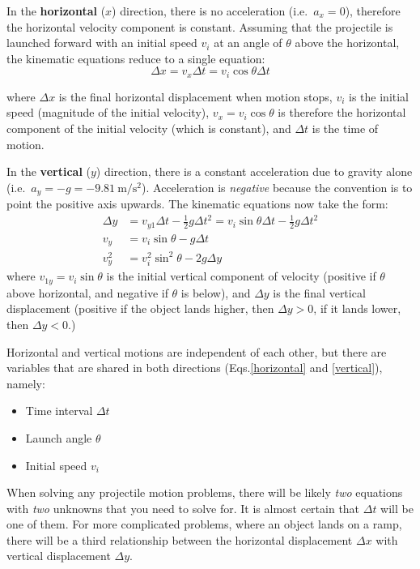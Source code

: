 In the \textbf{horizontal} ($x$) direction, there is no acceleration (i.e.\
$a_x=0$), therefore the horizontal velocity component is constant. Assuming
that the projectile is launched forward with an initial speed $v_i$ at an angle
of $\theta$ above the horizontal, the kinematic equations reduce to a single
equation:
\begin{equation}
  \Delta x=v_x\Delta t=v_i\cos\theta\Delta t
  \label{horizontal}
\end{equation}

where $\Delta x$ is the final horizontal displacement when motion stops,
$v_i$ is the initial speed (magnitude of the initial velocity),
$v_x=v_i\cos\theta$ is therefore the horizontal component of the
initial velocity (which is constant), and $\Delta t$ is the time of motion.

In the \textbf{vertical} ($y$) direction, there is a constant acceleration due
to gravity alone (i.e.\ $a_y=-g=\SI{-9.81}{\metre\per\second\squared}$).
Acceleration is \emph{negative} because the convention is to point the positive
axis upwards. The kinematic equations now take the form:
\begin{align}
  \Delta y &= v_{y1}\Delta t - \frac12 g\Delta t^2
  = v_i\sin\theta\Delta t - \frac12 g\Delta t^2\label{vertical}\\
  v_y &= v_i\sin\theta -g\Delta t\\
  v_y^2 &= v_i^2\sin^2\theta-2g\Delta y\label{height}
\end{align}
where $v_{1y}=v_i\sin\theta$ is the initial vertical component of velocity
(positive if $\theta$ above horizontal, and negative if $\theta$ is below), and
$\Delta y$ is the final vertical displacement (positive if the object lands
higher, then $\Delta y > 0$, if it lands lower, then $\Delta y<0$.)

Horizontal and vertical motions are independent of each other, but there are
variables that are shared in both directions (Eqs.\ref{horizontal} and
\ref{vertical}), namely:
\begin{itemize}[nosep]
\item Time interval $\Delta t$
\item Launch angle $\theta$
\item Initial speed $v_i$
\end{itemize}
When solving any projectile motion problems, there will be likely \emph{two}
equations with \emph{two} unknowns that you need to solve for. It is almost
certain that $\Delta t$ will be one of them. For more complicated problems,
where an object lands on a ramp, there will be a third relationship between
the horizontal displacement $\Delta x$ with vertical displacement $\Delta y$.



